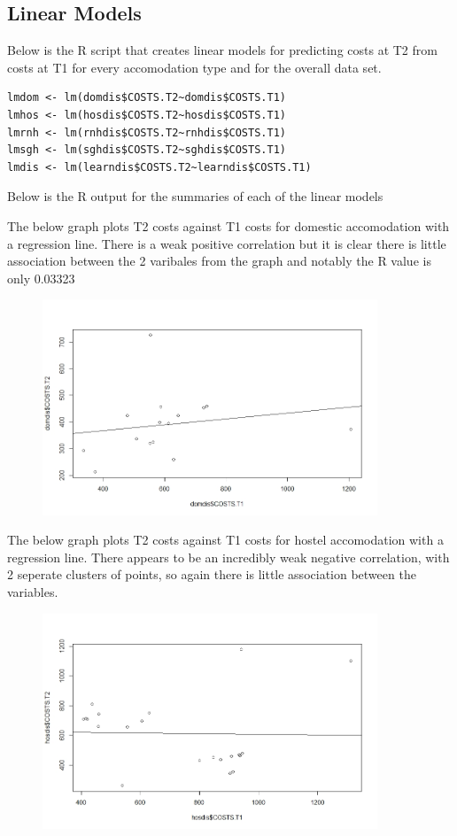 \documentclass[]{article}
\begin{document}
\subsection{Linear Models}
Below is the R script that creates linear models for predicting costs at T2 from costs at T1 for every accomodation type and for the overall data set.
\begin{lstlisting}
lmdom <- lm(domdis$COSTS.T2~domdis$COSTS.T1)
lmhos <- lm(hosdis$COSTS.T2~hosdis$COSTS.T1)
lmrnh <- lm(rnhdis$COSTS.T2~rnhdis$COSTS.T1)
lmsgh <- lm(sghdis$COSTS.T2~sghdis$COSTS.T1)
lmdis <- lm(learndis$COSTS.T2~learndis$COSTS.T1)
\end{lstlisting}
Below is the R output for the summaries of each of the linear models

The below graph plots T2 costs against T1 costs for domestic accomodation with a regression line. There is a weak positive correlation but it is clear there is little association between the 2 varibales from the graph and notably the R value is only 0.03323
\begin{figure}[H]
\centering
\includegraphics[width=10cm]{RStudio/jpeg/Reg_DOM.jpeg}
\end{figure}
The below graph plots T2 costs against T1 costs for hostel accomodation with a regression line. There appears to be an incredibly weak negative correlation, with 2 seperate clusters of points, so again there is little association between the variables.
\begin{figure}[H]
\centering
\includegraphics[width=10cm]{RStudio/jpeg/Reg_HOS.jpeg}
\end{figure}
\end{document}
